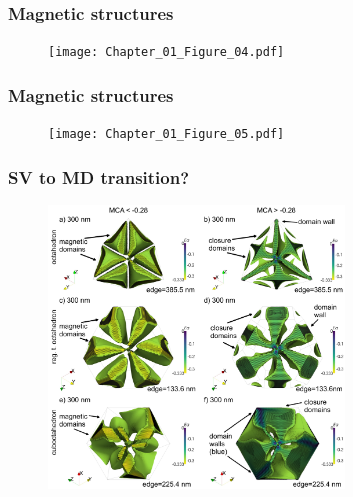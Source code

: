 \documentclass{beamer}
\begin{document}
                \begin{frame}
                  \frametitle{Magnetic structures}
                  \begin{figure}[htb]
                    \centering
                    \texttt{[image: Chapter\_01\_Figure\_04.pdf]}
                  \end{figure}
                \end{frame}

                \begin{frame}
                  \frametitle{Magnetic structures}
                  \begin{figure}[htb]
                    \centering
                    \texttt{[image: Chapter\_01\_Figure\_05.pdf]}
                  \end{figure}
                \end{frame}

                \begin{frame}
                  \frametitle{SV to MD transition?}
                  \begin{figure}[htb]
                    \centering
                    \includegraphics[width=0.7\textwidth]{Chapter_01_Figure_06.pdf}
                  \end{figure}
                \end{frame}
\end{document}
